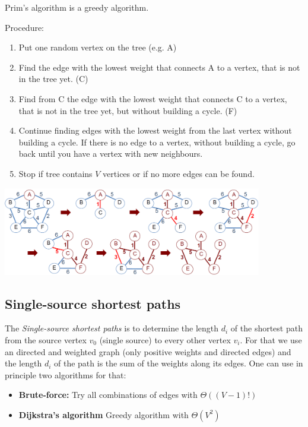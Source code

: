 Prim's algorithm is a greedy algorithm.

Procedure:
\begin{enumerate}
    \item Put one random vertex on the tree (e.g. A)
    \item Find the edge with the lowest weight that connects A to a vertex, that is not in the tree yet. (C)
    \item Find from C the edge with the lowest weight that connects C to a vertex, that is not in the tree yet, but without building a cycle. (F)
    \item Continue finding edges with the lowest weight from the last vertex without building a cycle. If there is no edge to a vertex, without building a cycle, go back until you have a vertex with new neighbours.
    \item Stop if tree contains $V$ vertices or if no more edges can be found.
\end{enumerate}

\begin{center}\includegraphics[width=0.85\textwidth]{img/graphs/PrimGraph.png}\end{center}

%

\subsection{Single-source shortest paths}

The \emph{Single-source shortest paths} is to determine the length $d_i$ of the shortest path from the source vertex $v_0$ (single source) to every other vertex $v_i$. For that we use an directed and weighted graph (only positive weights and directed edges) and the length $d_i$ of the path is the sum of the weights along its edges. One can use in principle two algorithms for that:

\begin{itemize}
    \item \textbf{Brute-force:} Try all combinations of edges with $\Theta((V-1)!)$
    \item \textbf{Dijkstra's algorithm} Greedy algorithm with $\Theta(V^2)$
\end{itemize}

